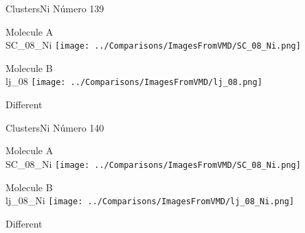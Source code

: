  \newpage

\vtab[-3cm]
\begin{center}
{\large ClustersNi \tab Número 139}
\end{center}
\begin{multicols}{2}
\begin{center}
Molecule A \\ 
SC\_08\_Ni
\texttt{[image: ../Comparisons/ImagesFromVMD/SC\_08\_Ni.png]}
\\
\vtab

\columnbreak
Molecule B \\ 
lj\_08
\texttt{[image: ../Comparisons/ImagesFromVMD/lj\_08.png]}
\\
\vtab


\end{center}
\end{multicols}
\begin{center}
\textcolor{NavyBlue}{\Large Different}
\end{center}

 \newpage

\vtab[-3cm]
\begin{center}
{\large ClustersNi \tab Número 140}
\end{center}
\begin{multicols}{2}
\begin{center}
Molecule A \\ 
SC\_08\_Ni
\texttt{[image: ../Comparisons/ImagesFromVMD/SC\_08\_Ni.png]}
\\
\vtab

\columnbreak
Molecule B \\ 
lj\_08\_Ni
\texttt{[image: ../Comparisons/ImagesFromVMD/lj\_08\_Ni.png]}
\\
\vtab


\end{center}
\end{multicols}
\begin{center}
\textcolor{NavyBlue}{\Large Different}
\end{center}

 \newpage

